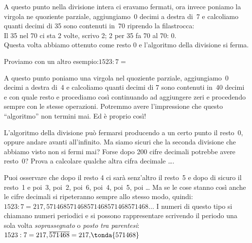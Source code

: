 A questo punto nella divisione intera ci eravamo fermati, 
ora invece poniamo la virgola ne quoziente parziale, 
aggiungiamo~0 decimi a destra di~7 e calcoliamo quanti decimi di 35 sono 
contenuti in~70 riprendo la filastrocca: \\
Il 35 nel 70 ci sta 2 volte, scrivo 2; 2 per 35 fa 70 al 70: 0.\\
Questa volta abbiamo ottenuto come resto 0 e l'algoritmo della divisione si 
ferma.

Proviamo con un altro esempio:\quad \(1523 : 7 =\)



A questo punto poniamo una virgola nel quoziente parziale,
aggiungiamo~0 decimi a destra di~4 e calcoliamo quanti decimi di 7 sono 
contenuti in~40 decimi e con quale resto e procediamo così continuando ad 
aggiungere zeri e procedendo sempre con le stesse operazioni.
Potremmo avere l'impressione che questo ``algoritmo'' non termini mai. 
Ed è proprio così!

L'algoritmo della divisione può fermarsi producendo a un certo punto il 
resto~0, oppure andare avanti all'infinito. Ma siamo sicuri che la seconda 
divisione che abbiamo visto non si fermi mai? Forse dopo 200 cifre decimali 
potrebbe avere resto~0? Prova a calcolare qualche altra cifra decimale \dots.

Puoi osservare che dopo il resto 4 ci sarà senz'altro il resto~5 e dopo di 
sicuro il resto~1 e poi~3, poi~2, poi~6, poi~4, poi~5, poi \dots
Ma se le cose stanno così anche le cifre decimali si ripeteranno sempre 
allo stesso modo, quindi: \\
\(1523 : 7 = 217,571468571468571468571468571468\ldots\)
I numeri di questo tipo si chiamano numeri periodici e si possono 
rappresentare scrivendo il periodo una sola volta \emph{soprassegnato} o 
\emph{posto tra parentesi}: \quad 
\(1523 : 7 = 217,\overline{571468} = 217,\!\tonda{571468}\)

